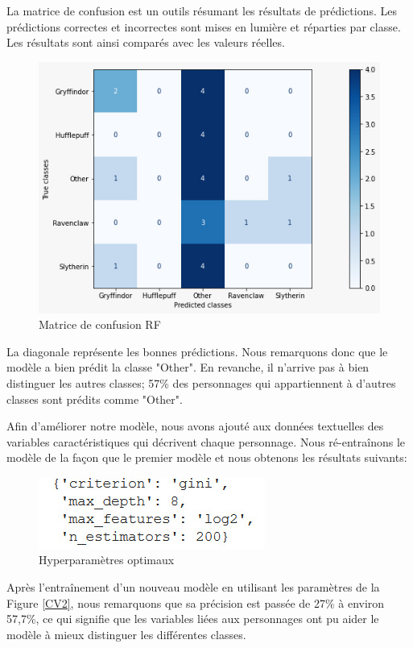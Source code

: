 \documentclass[11pt]{article}
\begin{document}
La matrice de confusion est un outils résumant les résultats de prédictions. Les prédictions correctes et incorrectes sont mises en lumière et réparties par classe. Les résultats sont ainsi comparés avec les valeurs réelles.

\begin{figure}[hbt!]
    \centering
    \includegraphics[width= 11 cm]{figures/matriceconfRF.jpeg}
    \caption{Matrice de confusion RF}
    \label{confRF}
\end{figure}
\FloatBarrier

La diagonale représente les bonnes prédictions. Nous remarquons donc que  le modèle a bien prédit la classe "Other". En revanche, il n'arrive pas à bien distinguer les autres classes; 57\% des personnages qui appartiennent à d'autres classes sont prédits comme "Other".\par

Afin d’améliorer notre modèle, nous avons ajouté aux données textuelles des variables caractéristiques qui décrivent chaque personnage. Nous ré-entraînons le modèle de la façon que le premier modèle et nous obtenons les résultats suivants:

\begin{figure}[hbt!]
    \centering
    \includegraphics[width= 7 cm]{figures/outputCVRF2.jpeg}
    \caption{Hyperparamètres optimaux}
    \label{CV2}
\end{figure}
\FloatBarrier

Après l’entraînement d'un nouveau modèle en utilisant les paramètres de la Figure \autoref{CV2}, nous remarquons que sa précision est passée de 27\% à environ 57,7\%, ce qui signifie que les variables liées aux personnages ont pu aider le modèle à mieux distinguer les différentes classes.
\end{document}
